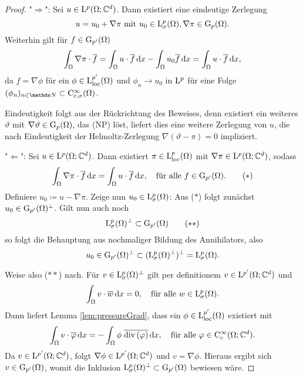 \begin{proof}
  "$\Rightarrow$": Sei $u \in\mathrm{L}^p(\Omega; \mathbb{C}^d)$.
  Dann existiert eine eindeutige Zerlegung 
  $$
  u = u_0 + \nabla \pi \text{ mit } u_0 \in \mathrm{L}_\sigma^p(\Omega), \nabla\pi \in \mathrm{G}_p(\Omega).
  $$
  Weiterhin gilt für $f \in \mathrm{G}_{p'}(\Omega)$
  $$
  \int_\Omega \nabla\pi \cdot \overline f = \int_\Omega u \cdot \overline f \, {\operatorname{d}\!{x}} - \int_\Omega u_0 \overline f \, {\operatorname{d}\!{x}}  = \int_\Omega u \cdot \overline f \, {\operatorname{d}\!{x}},
  $$
  da $f = \nabla \phi$ für ein $\phi \in \mathrm{L}_{\operatorname{loc}}^{p'}(\Omega)$ und $\phi_n \to u_0$ in $\mathrm{L}^p$ für eine Folge $(\phi_n)_{n \in \N} \subset \CC_{c,\sigma}^\infty(\Omega)$.

  Eindeutigkeit folgt aus der Rückrichtung des Beweises, denn existiert ein weiteres $\vartheta$ mit $\nabla\vartheta \in \mathrm{G}_p(\Omega)$, das (NP) löst, liefert dies eine weitere Zerlegung von $u$, die nach Eindeutigkeit der Helmoltz-Zerlegung $\nabla(\vartheta - \pi) = 0$ impliziert.

  "$\Leftarrow$": Sei $u \in \mathrm{L}^p(\Omega; \mathbb{C}^d)$. Dann existiert $\pi \in \mathrm{L}^p_{\operatorname{loc}}(\Omega)$ mit $\nabla \pi \in \mathrm{L}^p(\Omega; \mathbb{C}^d)$, sodass
  \begin{displaymath}
  \int_\Omega \nabla \pi \cdot \overline f \, {\operatorname{d}\!{x}} = \int_\Omega u \cdot \overline f \, {\operatorname{d}\!{x}}, \quad\text{für alle } f \in \mathrm{G}_{p'}(\Omega).
  \tag{$\ast$}
  \end{displaymath}
  Definiere $u_0 \coloneqq u - \nabla\pi$. 
  Zeige nun $u_0 \in \mathrm{L}_\sigma^p(\Omega)$:
  Aus ($\ast$) folgt zunächst $u_0 \in \mathrm{G}_{p'}(\Omega)^\perp$.
  Gilt nun auch noch 
  \begin{displaymath}
    \mathrm{L}^p_\sigma(\Omega)^\perp \subset \mathrm{G}_{p'}(\Omega) \tag{$\ast\ast$}
  \end{displaymath}
  so folgt die Behauptung aus nochmaliger Bildung des Annihilators, also
  $$
  u_0 \in \mathrm{G}_{p'}(\Omega)^\perp \subset ( \mathrm{L}_\sigma^p(\Omega)^\perp)^\perp = \mathrm{L}^p_\sigma(\Omega).
  $$

  Weise also ($\ast\ast$) nach. Für $v \in \mathrm{L}_\sigma^p(\Omega)^\perp$ gilt per definitionem $v \in \mathrm{L}^{p'}(\Omega; \mathbb{C}^d)$ und
  $$
  \int_\Omega v \cdot \overline w \, {\operatorname{d}\!{x}} = 0, \quad\text{für alle } w \in \mathrm{L}_\sigma^p(\Omega).
  $$
  Dann liefert Lemma \ref{lem:pressureGrad}, dass ein $\phi \in \mathrm{L}_{\operatorname{loc}}^{p'}(\Omega)$ existiert mit
  $$
  \int_\Omega v \cdot \overline \varphi \, {\operatorname{d}\!{x}} = -\int_\Omega \phi \; \overline{\mathrm{div\,} (\varphi)} \, {\operatorname{d}\!{x}}, \quad\text{für alle } \varphi \in \mathrm{C}_c^\infty(\Omega; \mathbb{C}^d).
  $$
  Da $v \in \mathrm{L}^{p'}(\Omega; \mathbb{C}^d)$, folgt $\nabla \phi \in \mathrm{L}^{p'}(\Omega; \mathbb{C}^d)$ und $v = \nabla \phi$.
  Hieraus ergibt sich $v \in \mathrm{G}_{p'}(\Omega)$, womit die Inklusion $\mathrm{L}_\sigma^p(\Omega)^\perp \subset \mathrm{G}_{p'}(\Omega)$ bewiesen wäre.


\end{proof}
